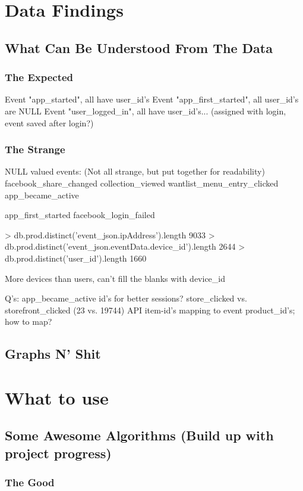 \section{Data Findings}
\subsection{What Can Be Understood From The Data}
\subsubsection{The Expected}
Event "app\_started", all have user\_id's
Event "app\_first\_started", all user\_id's are NULL
Event "user\_logged\_in", all have user\_id's... (assigned with login, event saved after login?)

\subsubsection{The Strange}
NULL valued events: (Not all strange, but put together for readability)
facebook\_share\_changed
collection\_viewed
wantlist\_menu\_entry\_clicked
app\_became\_active

app\_first\_started
facebook\_login\_failed

> db.prod.distinct('event\_json.ipAddress').length
9033
> db.prod.distinct('event\_json.eventData.device\_id').length
2644
> db.prod.distinct('user\_id').length
1660

More devices than users, can't fill the blanks with device\_id

Q's:
    app\_became\_active id's for better sessions?
    store\_clicked vs. storefront\_clicked (23 vs. 19744)
    API item-id's mapping to event product\_id's; how to map?

\subsection{Graphs N' Shit}

\section{What to use}
\subsection{Some Awesome Algorithms (Build up with project progress)}
\subsubsection{The Good}
